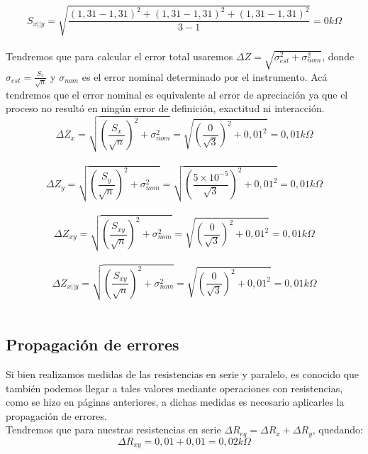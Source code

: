 \documentclass[12pt]{article}
\begin{document}
	\\
	\begin{equation*}
		S_{x||y} = \sqrt{\frac{(1,31 - 1,31)^2 + (1,31 - 1,31)^2 + (1,31 - 1,31)^2}{3 - 1}} = 0 k\Omega
	\end{equation*}
	\\
	\noindent Tendremos que para calcular el error total usaremos $\Delta Z = \sqrt{\sigma_{est}^2 + \sigma_{nom}^2}$, donde $\sigma_{est} = \frac{S_x}{\sqrt n}$ y $\sigma_{nom}$ es el error nominal determinado por el instrumento. Acá tendremos que el error nominal es equivalente al error de apreciación ya que el proceso no resultó en ningún error de definición, exactitud ni interacción.\\
	\begin{equation*}
	 	\Delta Z_x = \sqrt{(\frac{S_x}{\sqrt n})^2 + \sigma_{nom}^2} = \sqrt{(\frac{0}{\sqrt 3})^2 + 0,01^2} = 0,01k\Omega
	\end{equation*}
	 \\
	 \begin{equation*}
	 	\Delta Z_y = \sqrt{(\frac{S_y}{\sqrt n})^2 + \sigma_{nom}^2} = \sqrt{(\frac{5\times 10^{-5}}{\sqrt 3})^2 + 0,01^2} = 0,01k\Omega
	 \end{equation*}
	 \\
	 \begin{equation*}
	 	\Delta Z_{xy} = \sqrt{(\frac{S_{xy}}{\sqrt n})^2 + \sigma_{nom}^2} = \sqrt{(\frac{0}{\sqrt 3})^2 + 0,01^2} = 0,01k\Omega
	 \end{equation*}
	 \\
	 \begin{equation*}
	 	\Delta Z_{x||y} = \sqrt{(\frac{S_{xy}}{\sqrt n})^2 + \sigma_{nom}^2} = \sqrt{(\frac{0}{\sqrt 3})^2 + 0,01^2} = 0,01k\Omega
	 \end{equation*}
	 \\
	 \subsection{Propagación de errores}
	 \noindent Si bien realizamos medidas de las resistencias en serie y paralelo, es conocido que también podemos llegar a tales valores mediante operaciones con resistencias, como se hizo en páginas anteriores, a dichas medidas es necesario aplicarles la propagación de errores.
	 \\
	 
	 \noindent Tendremos que para nuestras resistencias en serie $\Delta R_{eq} = \Delta R_x + \Delta R_y$, quedando:\\
	 \begin{equation}
	 	\Delta R_{xy} = 0,01 + 0,01 = 0,02k\Omega
	 \end{equation}
 	 \\
 	 
\end{document}
